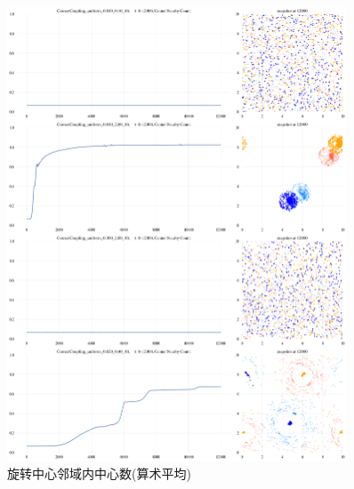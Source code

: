 \documentclass{article}
\begin{document}
\begin{figure}[H]
	\centering
	\includegraphics[width=0.9\textwidth]{./figs/centerNearbyCountsOp.png}
	\caption{旋转中心邻域内中心数(算术平均)}
	\label{fig:fig234t.4.2}
\end{figure}




\end{document}

